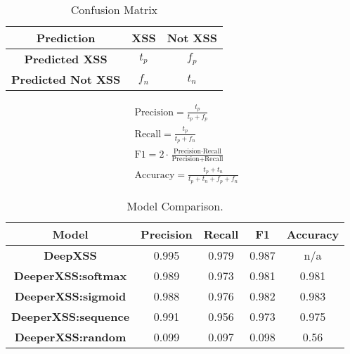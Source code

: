\begin{table}
\begin{center}
\begingroup
\setlength{\tabcolsep}{10pt} %
\renewcommand{\arraystretch}{1.5} %
\begin{tabular}{|| c | c | c ||} 
    \hline
    Prediction & XSS & Not XSS \\ 
    \hline\hline
    \textbf{Predicted XSS} &  $t_p$ & $f_p$ \\ 
    \hline
    \textbf{Predicted Not XSS} & $f_n$ & $t_n$ \\
    \hline
\end{tabular}
\endgroup
\caption{\label{conf-mat}Confusion Matrix}
\end{center}
\end{table}


\begin{align*}
    &\text{Precision} = \frac{t_p}{t_p + f_p} \\[10pt]
    &\text{Recall} = \frac{t_p}{t_p + f_n} \\[10pt]
    &\text{F1} = 2 \cdot \frac{\text{Precision} \cdot \text{Recall}}{\text{Precision} + \text{Recall}}\\[10pt]
    &\text{Accuracy} = \frac{t_p + t_n}{t_p + t_n + f_p + f_n}
\end{align*}

\begin{table}
\begin{center}
\begingroup
\setlength{\tabcolsep}{4pt} %
\renewcommand{\arraystretch}{1.5} %
\begin{tabular}{|| c | c | c | c | c ||} 
    \hline
    Model & Precision & Recall & F1 & Accuracy \\ 
    \hline\hline
    \textbf{DeepXSS} &  0.995 & 0.979 & 0.987 & n/a \\ 
    \hline
    \textbf{DeeperXSS:softmax} & 0.989 & 0.973 & 0.981 & 0.981 \\
    \hline
    \textbf{DeeperXSS:sigmoid} & 0.988 & 0.976 & 0.982 & 0.983 \\
    \hline
    \textbf{DeeperXSS:sequence} & 0.991 & 0.956 & 0.973 & 0.975 \\
    \hline
    \textbf{DeeperXSS:random} & 0.099 & 0.097 & 0.098 & 0.56 \\
    \hline
\end{tabular}
\endgroup
\caption{\label{comparison}Model Comparison.}
\end{center}
\end{table}